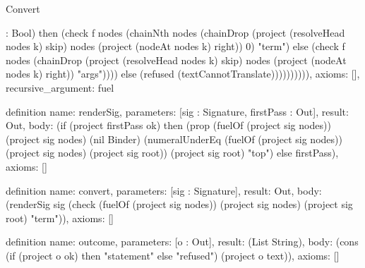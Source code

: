 \begin{lexlean}{Convert}
\begin{semanticmodule}
{: Bool) then (check f nodes (chainNth nodes (chainDrop (project (resolveHead nodes k) skip) nodes (project (nodeAt nodes k) right)) 0) "term") else (check f nodes (chainDrop (project (resolveHead nodes k) skip) nodes (project (nodeAt nodes k) right)) "args")))) else (refused (textCannotTranslate)))))))))),
  axioms: [],
  recursive_argument: fuel
}

definition{
  name: renderSig,
  parameters: [sig : Signature, firstPass : Out],
  result: Out,
  body: (if (project firstPass ok) then (prop (fuelOf (project sig nodes)) (project sig nodes) (nil Binder) (numeralUnderEq (fuelOf (project sig nodes)) (project sig nodes) (project sig root)) (project sig root) "top") else firstPass),
  axioms: []
}

definition{
  name: convert,
  parameters: [sig : Signature],
  result: Out,
  body: (renderSig sig (check (fuelOf (project sig nodes)) (project sig nodes) (project sig root) "term")),
  axioms: []
}

definition{
  name: outcome,
  parameters: [o : Out],
  result: (List String),
  body: (cons (if (project o ok) then "statement" else "refused") (project o text)),
  axioms: []
}


\end{semanticmodule}
\end{lexlean}
